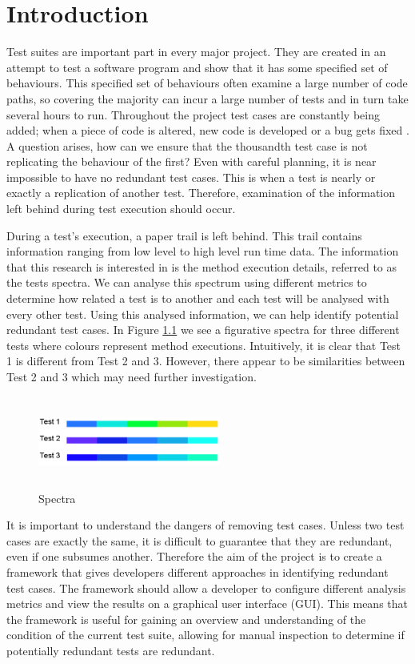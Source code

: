 \chapter{Introduction}\label{C:intro}

Test suites are important part in every major project. They are created in an attempt to test a software program and show that it has some specified set of behaviours. This specified set of behaviours often examine a large number of code paths, so covering the majority can incur a large number of tests and in turn take several hours to run. Throughout the project test cases are constantly being added; when a piece of code is altered, new code is developed or a bug gets fixed \cite{issuetrack,whentotest}. A question arises, how can we ensure that the thousandth test case is not replicating the behaviour of the first? Even with careful planning, it is near impossible to have no redundant test cases. This is when a test is nearly or exactly a replication of another test. Therefore, examination of the information left behind during test execution should occur. 

During a test's execution, a paper trail is left behind. This trail contains information ranging from low level to high level run time data. The information that this research is interested in is the method execution details, referred to as the tests spectra. We can analyse this spectrum using different metrics to determine how related a test is to another and each test will be analysed with every other test. Using this analysed information, we can help identify potential redundant test cases. In Figure \ref{fig:spectra} we see a figurative spectra for three different tests where colours represent method executions. Intuitively, it is clear that Test 1 is different from Test 2 and 3. However, there appear to be similarities between Test 2 and 3 which may need further investigation.

\begin{figure}[h]
\centering
\includegraphics[width=6cm,height=3cm]{spectra.png}
\caption{Spectra}
\label{fig:spectra}
\end{figure}

It is important to understand the dangers of removing test cases. Unless two test cases are exactly the same, it is difficult to guarantee that they are redundant, even if one subsumes another. Therefore the aim of the project is to create a framework that gives developers different approaches in identifying redundant test cases. The framework should allow a developer to configure different analysis metrics and view the results on a graphical user interface (GUI). This means that the framework is useful for gaining an overview and understanding of the condition of the current test suite, allowing for manual inspection to determine if potentially redundant tests are redundant.

